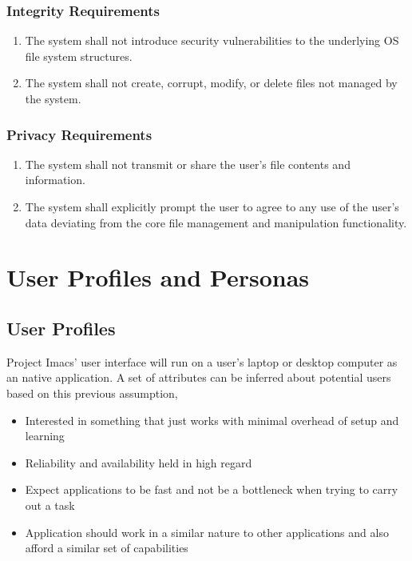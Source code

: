 \documentclass{article}
\begin{document}
\subsubsection{Integrity Requirements}
\begin{enumerate}[{I}NT1]
    \item The system shall not introduce security vulnerabilities to the underlying OS file system structures.
    \item The system shall not create, corrupt, modify, or delete files not managed by the system.
\end{enumerate}

\subsubsection{Privacy Requirements}
\begin{enumerate}[PR{I}1]
    \item The system shall not transmit or share the user's file contents and information.
    \item The system shall explicitly prompt the user to agree to any use of the user's data deviating from the core file management and manipulation functionality.
\end{enumerate}

\section{User Profiles and Personas}
\subsection{User Profiles}
Project Imacs' user interface will run on a user's laptop or desktop computer as an
native application. A set of attributes can be inferred about potential users based on
this previous assumption,

\begin{itemize}
    \item Interested in something that just works with minimal overhead of setup and
        learning
    \item Reliability and availability held in high regard
    \item Expect applications to be fast and not be a bottleneck when trying to carry out
        a task
    \item Application should work in a similar nature to other applications and also
        afford a similar set of capabilities
\end{itemize}
\end{document}
